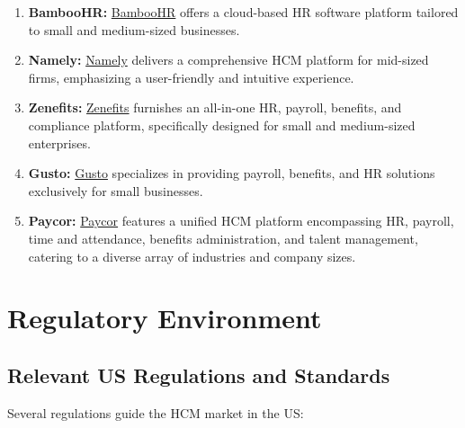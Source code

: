 \documentclass[
  a4paper,
]{book}
\renewcommand{\labelenumi}{\textbf{\textcolor{com-color}{\arabic*.}}}%
\begin{document}
\begin{enumerate}
\def\labelenumi{\arabic{enumi}.}
\item
  \textbf{BambooHR:} \href{https://www.bamboohr.com/}{BambooHR} offers a
  cloud-based HR software platform tailored to small and medium-sized
  businesses.
\item
  \textbf{Namely:} \href{https://www.namely.com/}{Namely} delivers a
  comprehensive HCM platform for mid-sized firms, emphasizing a
  user-friendly and intuitive experience.
\item
  \textbf{Zenefits:} \href{https://www.zenefits.com/}{Zenefits}
  furnishes an all-in-one HR, payroll, benefits, and compliance
  platform, specifically designed for small and medium-sized
  enterprises.
\item
  \textbf{Gusto:} \href{https://gusto.com/}{Gusto} specializes in
  providing payroll, benefits, and HR solutions exclusively for small
  businesses.
\item
  \textbf{Paycor:} \href{https://www.paycor.com/}{Paycor} features a
  unified HCM platform encompassing HR, payroll, time and attendance,
  benefits administration, and talent management, catering to a diverse
  array of industries and company sizes.
\end{enumerate}

\hypertarget{regulatory-environment}{%
\section{Regulatory Environment}\label{regulatory-environment}}

\hypertarget{relevant-us-regulations-and-standards}{%
\subsection{Relevant US Regulations and
Standards}\label{relevant-us-regulations-and-standards}}

Several regulations guide the HCM market in the US:
\end{document}
